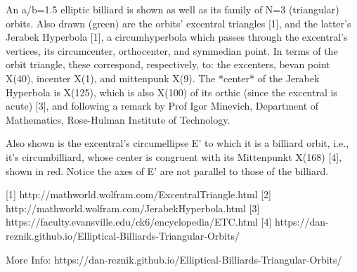 An a/b=1.5 elliptic billiard is shown as well as its family of N=3 (triangular) orbits. Also drawn (green) are the orbits' excentral triangles [1], and the latter's Jerabek Hyperbola [1], a circumhyperbola which passes through the excentral's vertices, its circumcenter, orthocenter, and symmedian point. In terms of the orbit triangle, these correspond, respectively, to: the excenters, bevan point X(40), incenter X(1), and mittenpunk X(9). The *center* of the Jerabek Hyperbola is X(125), which is also X(100) of its orthic (since the excentral is acute) [3], and following a remark by Prof Igor Minevich, Department of Mathematics, Rose-Hulman Institute of Technology.

Also shown is the excentral's circumellipse E' to which it is a billiard orbit, i.e., it's circumbilliard, whose center is congruent with its Mittenpunkt X(168) [4], shown in red. Notice the axes of E' are not parallel to those of the billiard.

[1] http://mathworld.wolfram.com/ExcentralTriangle.html
[2] http://mathworld.wolfram.com/JerabekHyperbola.html
[3] https://faculty.evansville.edu/ck6/encyclopedia/ETC.html
[4] https://dan-reznik.github.io/Elliptical-Billiards-Triangular-Orbits/

More Info: https://dan-reznik.github.io/Elliptical-Billiards-Triangular-Orbits/